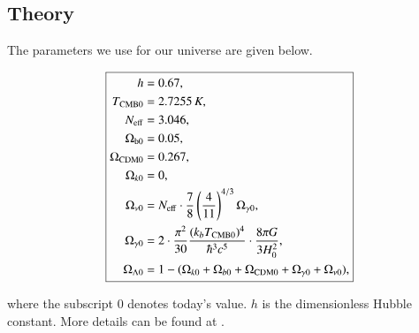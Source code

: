 \documentclass{aa}
\begin{document}
\subsection{Theory}
The parameters we use for our universe are given below.

\begin{equation}
      \boxed{
   \begin{aligned}
      h &= 0.67, \\
      T_{\rm CMB 0} &= 2.7255\,K, \\
      N_{\rm eff} &= 3.046, \\
      \Omega_{\rm b 0} &= 0.05, \\
      \Omega_{\rm CDM 0} &= 0.267,\\
      \Omega_{k 0} &= 0, \\
      \Omega_{\nu 0} &= N_{\rm eff}\cdot \frac{7}{8}\left(\frac{4}{11}\right)^{4/3}\Omega_{\gamma 0}, \\
      \Omega_{\gamma 0} &= 2\cdot \frac{\pi^2}{30} \frac{(k_bT_{\rm CMB 0})^4}{\hbar^3 c^5} \cdot \frac{8\pi G}{3H_0^2},\\
      \Omega_{\Lambda 0} &= 1 - (\Omega_{k 0}+\Omega_{b 0}+\Omega_{\rm CDM 0}+\Omega_{\gamma 0}+\Omega_{\nu 0}),
   \end{aligned}}
\end{equation}

\vspace*{0.3cm}
\noindent
where the subscript 0 denotes today's value. $h$ is the dimensionless Hubble constant. More details can be found at \cite{winther:2023}. \\ \\
\end{document}
